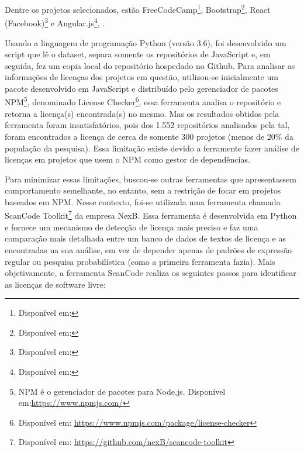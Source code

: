 Dentre os projetos selecionados, estão 
FreeCodeCamp\footnote{Disponível em: },
Bootstrap\footnote{Disponível em: },
React (Facebook)\footnote{Disponível em: } e 
Angular.js\footnote{Disponível em: },
.

Usando a linguagem de programação Python (versão 3.6), foi desenvolvido um script que lê o dataset, separa somente os repositórios de JavaScript e, em seguida, fez um copia local do repositório hospedado no Github.%
Para analisar as informações de licenças dos projetos em questão, utilizou-se inicialmente um pacote desenvolvido em JavaScript e distribuído pelo gerenciador de pacotes NPM\footnote{NPM é o gerenciador de pacotes para Node.js.%
Disponível em:\url{https://www.npmjs.com/}}, denominado License Checker\footnote{Disponível em: \url{https://www.npmjs.com/package/license-checker}}, essa ferramenta analisa o repositório e retorna a licença(s) encontrada(s) no mesmo. Mas os resultados obtidos pela ferramenta foram insatisfatórios, pois dos 1.552 repositórios analisados pela tal, foram encontrados a licença de cerca de somente 300 projetos (menos de 20\% da população da pesquisa). Essa limitação existe devido a ferramente fazer análise de licenças em projetos que usem o NPM como gestor de dependências.

Para minimizar essas limitações, buscou-se outras ferramentas que apresentassem comportamento semelhante, no entanto, sem a restrição de focar em projetos baseados em NPM. Nesse contexto, foi-se utilizada uma ferramenta chamada ScanCode Toolkit\footnote{Disponível em: \url{https://github.com/nexB/scancode-toolkit}} da empresa NexB. Essa ferramenta é desenvolvida em Python e fornece um mecanismo de detecção de licença mais preciso e faz uma comparação mais detalhada entre um banco de dados de textos de licença e as encontradas na sua análise, em vez de depender apenas de padrões de expressão regular ou pesquisa probabilística (como a primeira ferramenta fazia). Mais objetivamente, a ferramenta ScanCode realiza os seguintes passos para identificar as licenças de software livre:

